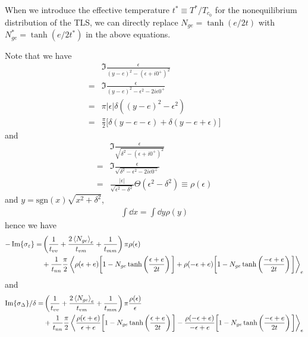 \documentclass[aps,prl,preprint]{revtex4-2}
\begin{document}
When we introduce the effective temperature $t^* \equiv T^*/T_{c_0}$ for the nonequilibrium distribution of the TLS,
we can directly replace $N_{ge} = \tanh(e/2t)$
with $N_{ge}^* = \tanh(e/2t^*)$ in the above equations.

Note that we have
\begin{align}
      & \Im{ \frac{\epsilon}{ (y-e)^2 - (\epsilon+i0^+)^2} }                  \\
    = & \Im{ \frac{\epsilon}{ (y-e)^2 - \epsilon^2 - 2i\epsilon 0^+ } }       \\
    = & \pi |\epsilon| \delta\left((y-e)^2-\epsilon^2\right)                  \\
    = & \frac{\pi}{2} \bigg[\delta(y-e-\epsilon) + \delta(y-e+\epsilon)\bigg]
\end{align}
and
\begin{align}
      & \Im{\frac{\epsilon}{\sqrt{\delta^2 - (\epsilon+i0^+)^2}}}                                      \\
    = & \Im{\frac{\epsilon}{\sqrt{\delta^2 - \epsilon^2 - 2i\epsilon 0^+}}}                            \\
    = & \frac{|\epsilon|}{\sqrt{\epsilon^2-\delta^2}}\Theta(\epsilon^2-\delta^2) \equiv \rho(\epsilon)
\end{align}
and $y = \text{sgn}(x)\sqrt{x^2+\delta^2}$,
\begin{align}
    \int\dd x = \int\dd y\rho(y)
\end{align}
hence we have
\begin{align}
    -\Im{\sigma_\varepsilon} = & \left(\frac{1}{t_{vv}} + \frac{2\ev{N_{ge}}_e}{t_{vm}} + \frac{1}{t_{mm}}\right)\pi\rho(\epsilon)               \\
                               & + \frac{1}{t_{nn}}\frac{\pi}{2} \ev{\rho(\epsilon+e)\bigg[1-N_{ge}\tanh\left(\frac{\epsilon+e}{2t}\right)\bigg]
    + \rho(-\epsilon+e)\bigg[1-N_{ge}\tanh\left(\frac{-\epsilon+e}{2t}\right)\bigg]}_e \nonumber
\end{align}
and
\begin{align}
    \Im{\sigma_\Delta}/\delta = & \left(\frac{1}{t_{vv}} + \frac{2\ev{N_{ge}}_e}{t_{vm}} + \frac{1}{t_{mm}}\right)\pi\frac{\rho(\epsilon)}{\epsilon}                 \\
                                & + \frac{1}{t_{nn}}\frac{\pi}{2} \ev{\frac{\rho(\epsilon+e)}{\epsilon+e}\bigg[1-N_{ge}\tanh\left(\frac{\epsilon+e}{2t}\right)\bigg]
    - \frac{\rho(-\epsilon+e)}{-\epsilon+e}\bigg[1-N_{ge}\tanh\left(\frac{-\epsilon+e}{2t}\right)\bigg]}_e \nonumber
\end{align}
\end{document}
